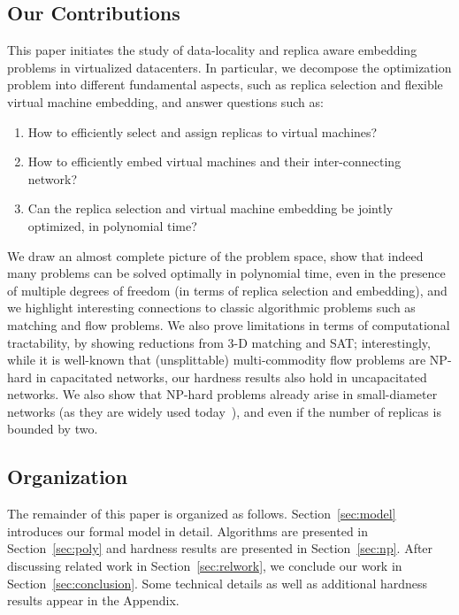 \documentclass[9pt]{sigcomm-alternate}
\begin{document}
\subsection{Our Contributions}

This paper initiates the study of data-locality and replica aware embedding problems in virtualized datacenters.
In particular, we decompose the optimization problem into different fundamental aspects, such as
replica selection and flexible virtual machine embedding, and answer questions such as:
\begin{enumerate}
\item How to efficiently select and assign replicas to virtual machines?

\item How to efficiently embed virtual machines and their inter-connecting network?

\item Can the replica selection and virtual machine embedding be jointly optimized, in polynomial time?
\end{enumerate}

We draw an almost complete picture of the problem space, show that indeed many problems
can be solved optimally in polynomial time, even in the presence of multiple degrees of freedom (in terms of
replica selection and embedding), and
we highlight interesting connections to classic algorithmic
problems such as matching and flow problems.
We also prove limitations in terms of
computational tractability, by showing reductions from 3-D matching and SAT; interestingly,
while it is well-known that (unsplittable) multi-commodity flow
problems are NP-hard in capacitated networks, our hardness results also hold in uncapacitated
networks. We also show that NP-hard problems already arise in small-diameter networks (as they are
widely used today~\cite{fattree}),
and even if the number of replicas is bounded by two.


\subsection{Organization}

The remainder of this paper is organized as follows.
Section~\ref{sec:model} introduces our formal model in detail.
Algorithms are presented in Section~\ref{sec:poly} and
hardness results are presented in Section~\ref{sec:np}.
After discussing related work in Section~\ref{sec:relwork},
we conclude our work in Section~\ref{sec:conclusion}.
Some technical details as well as additional hardness results
appear in the Appendix.
\end{document}
